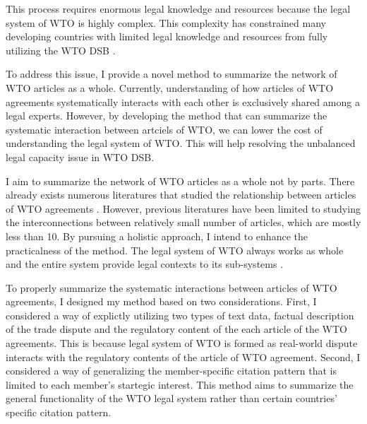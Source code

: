 This process requires enormous legal knowledge and resources because the legal system of WTO is highly complex.
This complexity has constrained many developing countries with limited legal knowledge and resources from fully utilizing the WTO DSB
\citep{busch_reinhardt_shaffer_2009, dev_busch, shaffer_2006}. 

To address this issue, I provide a novel method to summarize the network of WTO articles as a whole.
Currently, understanding of how articles of WTO agreements systematically interacts with each other is exclusively shared among a legal experts.
However, by developing the method that can summarize the systematic interaction between artciels of WTO,
we can lower the cost of understanding the legal system of WTO. This will help resolving the unbalanced legal capacity issue in WTO DSB. 


I aim to summarize the network of WTO articles as a whole not by parts.
There already exists numerous literatures that studied the relationship between articles of WTO agreements \citep{chadXXIII, charnovitz, Trachtman, who_gets}.
However, previous literatures have been limited to studying the interconnections between relatively small number of articles, which are mostly less than 10. %
By pursuing a holistic approach, I intend to enhance the practicalness of the method. The legal system of WTO always works as whole and the entire system provide legal contexts to its sub-systems \citep{system_as_a_whole}.

To properly summarize the systematic interactions between articles of WTO agreements, I designed my method based on two considerations.
First, I considered a way of explictly utilizing two types of text data, factual description of the trade dispute and the regulatory content of the each article of the WTO agreements.
This is because legal system of WTO is formed as real-world dispute interacts with the regulatory contents of the article of WTO agreement.
Second, I considered a way of generalizing the member-specific citation pattern that is limited to each member's startegic interest.
This method aims to summarize the general functionality of the WTO legal system rather than certain countries' specific citation pattern.

